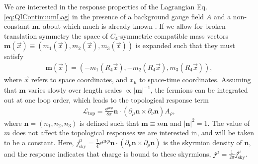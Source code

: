 \documentclass[%
 reprint,
 amsmath,amssymb,
 aps,
]{revtex4-1}
\begin{document}
We are interested in the response properties of the Lagrangian Eq. \ref{eq:QIContinuumLag} in the presence of a background gauge field $A$ and a non-constant $\bm{m}$, about which much is already known \cite{jaroszewicz1984induced,abanov2000topological,chamon2008irrational,grover2008topological}. If we allow for broken translation symmetry the space of $C_4$-symmetric compatible mass vectors $\bm{m}(\vec{x}) \equiv (m_{1}(\vec{x}),m_{2}(\vec{x}),m_{3}(\vec{x}))$ is expanded such that they must satisfy
\begin{equation}\begin{split}
\bm{m}(\vec{x})  = (-m_{1}(R_4\vec{x}),-m_{2}(R_4\vec{x}),m_{3}(R_4\vec{x})),\label{eq:MassC4Rot}\end{split}\end{equation}
where $\vec{x}$ refers to space coordinates, and $x_\mu$ to space-time coordinates. 
Assuming that $\bm{m}$ varies slowly over length scales $\propto |\bm{m}|^{-1}$, the fermions can be integrated out at one loop order, which leads to the topological response term 
\begin{equation}\begin{split}
\mathcal{L}_{\text{top}} = \frac{\epsilon^{\mu\nu\rho}}{8\pi}  \bm{n}\cdot(\partial_\mu \bm{n}\times \partial_\nu \bm{n}) A_\rho,
\label{eq:ResponseSkyrm}\end{split}\end{equation}
where $\bm{n} = (n_1,n_2,n_3)$ is defined such that $\bm{m} \equiv m \bm{n}$ and $|\bm{n}|^2 = 1$. The value of $m$ does not affect the topological responses we are interested in, and will be taken to be a constant. Here, $j^\mu_{\text{sky}} = \frac{1}{4} \epsilon^{\mu\nu\rho} \bm{n}\cdot(\partial_\nu \bm{n}\times \partial_\rho \bm{n})$ is the skyrmion density of $\bm{n},$ and the response indicates that charge is bound to these skyrmions, $j^\mu = \frac{1}{2\pi} j^\mu_{\text{sky}}$. 
\end{document}
